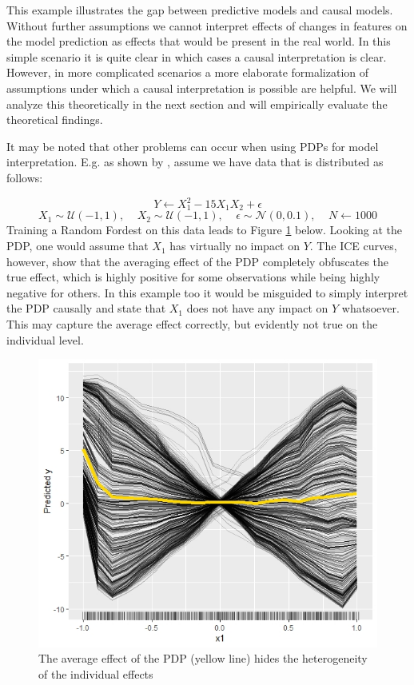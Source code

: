 \documentclass[]{krantz}
\begin{document}
This example illustrates the gap between predictive models and causal
models. Without further assumptions we cannot interpret effects of
changes in features on the model prediction as effects that would be
present in the real world. In this simple scenario it is quite clear in
which cases a causal interpretation is clear. However, in more
complicated scenarios a more elaborate formalization of assumptions
under which a causal interpretation is possible are helpful. We will
analyze this theoretically in the next section and will empirically
evaluate the theoretical findings.

It may be noted that other problems can occur when using PDPs for model
interpretation. E.g. as shown by \citep{scholbeck}, assume we have data
that is distributed as follows:

\[ Y \leftarrow  X_{1}^2 - 15X_{1}X_2 + \epsilon \]
\[ X_1 \sim \mathcal{U}(-1, 1), \ \ \ \ \ X_2 \sim \mathcal{U}(-1, 1), \ \ \ \ \ \epsilon \sim \mathcal{N}(0,0.1), \ \ \ \ \ N \leftarrow 1000    \]
Training a Random Fordest on this data leads to Figure \ref{fig:Figure2}
below. Looking at the PDP, one would assume that \(X_1\) has virtually
no impact on \(Y\). The ICE curves, however, show that the averaging
effect of the PDP completely obfuscates the true effect, which is highly
positive for some observations while being highly negative for others.
In this example too it would be misguided to simply interpret the PDP
causally and state that \(X_1\) does not have any impact on \(Y\)
whatsoever. This may capture the average effect correctly, but evidently
not true on the individual level.

\begin{figure}

\includegraphics[width=1\linewidth]{images/avg_vs_individual} \hfill{}

\caption{The average effect of the PDP (yellow line) hides the heterogeneity of the individual effects }\label{fig:Figure2}
\end{figure}
\end{document}
